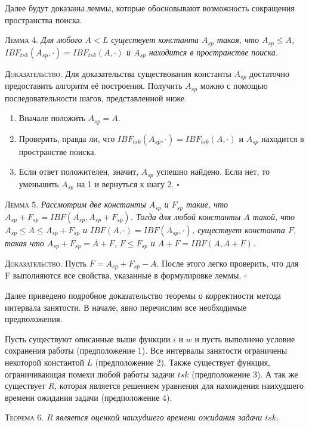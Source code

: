 Далее будут доказаны леммы, которые обосновывают возможность сокращения пространства поиска.

\textsc{Лемма 4.}
\textit{Для любого $A < L $ существует константа $A_{sp}$ такая, что $ A_{sp} \leq A$, $IBF_{tsk}(A_{sp}, \cdot) = IBF_{tsk}(A, \cdot)$ и $A_{sp}$ находится в пространстве поиска.}

\textsc{Доказательство.} Для доказательства существования константы $A_{sp}$ достаточно предоставить алгоритм её построения. Получить $A_{sp}$ можно с помощью последовательности шагов, представленной ниже.
    \begin{enumerate}
        \item Вначале положить $A_{sp} = A$.
        \item Проверить, правда ли, что $IBF_{tsk}(A_{sp}, \cdot) = IBF_{tsk}(A, \cdot)$ и $A_{sp}$ находится в пространстве поиска.
        \item Если ответ положителен, значит, $A_{sp}$ успешно найдено. Если нет, то уменьшить $A_{sp}$ на 1 и вернуться к шагу 2. $\square$
    \end{enumerate}


\textsc{Лемма 5.}
\textit{Рассмотрим две константы $A_{sp}$ и $F_{sp}$ такие, что $A_{sp} + F_{sp} = IBF(A_{sp}, A_{sp} + F_{sp})$. Тогда для любой константы $A$ такой, что $A_{sp} \leq A \leq A_{sp} + F_{sp}$ и $IBF(A, \cdot) = IBF(A_{sp},\cdot)$, существует константа $F$, такая что $A_{sp} + F_{sp} = A + F$, $F \leq F_{sp}$ и $A + F = IBF(A, A + F)$.}

\textsc{Доказательство.} Пусть $F = A_{sp} + F_{sp} - A$. После этого легко проверить, что для F выполняются все свойства, указанные в формулировке леммы. $\square$


Далее приведено подробное доказательство теоремы о корректности метода интервала занятости.
  В начале, явно перечислим все необходимые предположения.

Пусть существуют описанные выше функции $i$ и $w$ и пусть выполнено условие сохранения работы (предположение 1).
  Все интервалы занятости ограничены некоторой константой $L$ (предположение 2).
  Также существует функция, ограничивающая помехи любой работы задачи $tsk$ (предположение 3).
  А так же существует $R$, которая является решением уравнения для нахождения наихудшего
  времени ожидания задачи (предположение 4).

\textsc{Теорема 6.}
\textit{$R$ является оценкой наихудшего времени ожидания задачи $tsk$. }

